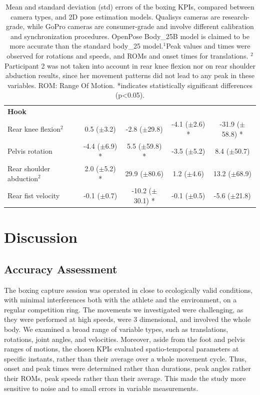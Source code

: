 \begin{table}[!ht]
{\begin{tabular}{lcccc}
            \textbf{Hook}\\
            Rear knee flexion\(^2\) & 0.5 ($\pm$3.2) & -2.8 ($\pm$29.8) & -4.1 ($\pm$2.6) * & -31.9 ($\pm$58.8) * \\
            Pelvis rotation &  -4.4 ($\pm$6.9) * & 5.5 ($\pm$59.8) * & -3.5 ($\pm$5.2) & 8.4 ($\pm$50.7)\\
            Rear shoulder abduction\(^2\) & 2.0 ($\pm$5.2) * & 29.9 ($\pm$80.6) & 1.2 ($\pm$4.6) & 13.2 ($\pm$68.9) \\
            Rear fist velocity & -0.1 ($\pm$0.7) & -10.2 ($\pm$30.1) * & -0.1 ($\pm$0.5) & -5.6 ($\pm$21.8)\\
            \bottomrule
      \end{tabular}}
      \caption{Mean and standard deviation (std) errors of the boxing KPIs, compared between camera types, and 2D pose estimation models. Qualisys cameras are research-grade, while GoPro cameras are consumer-grade and involve different calibration and synchronization procedures. OpenPose Body\_25B model is claimed to be more accurate than the standard body\_25 model.\(^1\)Peak values and times were observed for rotations and speeds, and ROMs and onset times for translations. \(^2\)Participant 2 was not taken into account in rear knee flexion nor on rear shoulder abduction results, since her movement patterns did not lead to any peak in these variables.  ROM: Range Of Motion. *indicates statistically significant differences (p<0.05).}
      \label{table:tab_protoc}
\end{table}



\FloatBarrier
\section{Discussion}

\subsection{Accuracy Assessment}

The boxing capture session was operated in close to ecologically valid conditions, with minimal interferences both with the athlete and the environment, on a regular competition ring. The movements we investigated were challenging, as they were performed at high speeds, were 3 dimensional, and involved the whole body. We examined a broad range of variable types, such as translations, rotations, joint angles, and velocities. Moreover, aside from the foot and pelvis ranges of motions, the chosen KPIs evaluated spatio-temporal parameters at specific instants, rather than their average over a whole movement cycle. Thus, onset and peak times were determined rather than durations, peak angles rather their ROMs, peak speeds rather than their average. This made the study more sensitive to noise and to small errors in variable measurements.

